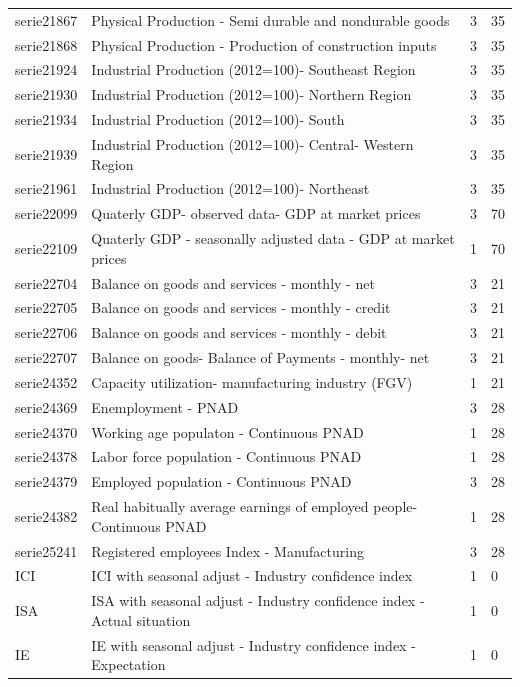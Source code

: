 \documentclass{article}
\begin{document}
\begin{landscape}
\begin{center}
\begin{longtable}{|l|l|l|l|}
serie21867 & Physical Production - Semi durable and nondurable goods & 3 & 35 \\
serie21868 & Physical Production - Production of construction inputs & 3 & 35 \\
serie21924 & Industrial Production (2012=100)- Southeast Region & 3 & 35 \\
serie21930 & Industrial Production (2012=100)- Northern Region & 3 & 35 \\
serie21934 & Industrial Production (2012=100)- South & 3 & 35 \\
serie21939 & Industrial Production (2012=100)- Central- Western Region & 3 & 35 \\
serie21961 & Industrial Production (2012=100)- Northeast & 3 & 35 \\
serie22099 & Quaterly GDP- observed data- GDP at market prices & 3 & 70 \\
serie22109 & Quaterly GDP - seasonally adjusted data - GDP at market prices & 1 & 70 \\
serie22704 & Balance on goods and services - monthly - net & 3 & 21 \\
serie22705 & Balance on goods and services - monthly - credit & 3 & 21 \\
serie22706 & Balance on goods and services - monthly - debit & 3 & 21 \\
serie22707 & Balance on goods- Balance of Payments - monthly- net & 3 & 21 \\
serie24352 & Capacity utilization- manufacturing industry (FGV) & 1 & 21 \\
serie24369 & Enemployment - PNAD & 3 & 28 \\
serie24370 & Working age populaton - Continuous PNAD & 1 & 28 \\
serie24378 & Labor force population - Continuous PNAD & 1 & 28 \\
serie24379 & Employed population - Continuous PNAD & 3 & 28 \\
serie24382 & Real habitually average earnings of employed people- Continuous PNAD & 1 & 28 \\
serie25241 & Registered employees Index - Manufacturing & 3 & 28 \\
ICI & ICI with seasonal adjust - Industry confidence index & 1 & 0 \\
ISA & ISA with seasonal adjust - Industry confidence index - Actual situation & 1 & 0 \\
IE & IE with seasonal adjust - Industry confidence index - Expectation & 1 & 0 \\

\end{longtable}
\end{center}
\end{landscape}
\end{document}
